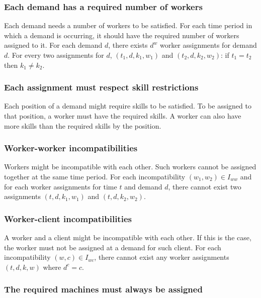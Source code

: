 \documentclass[../thesis.tex]{subfiles}
\begin{document}
\subsubsection{Each demand has a required number of workers}

Each demand needs a number of workers to be satisfied. 
For each time period in which a demand is occurring, it should have the required 
number of workers assigned to it.
For each demand $d$, there exists $d^w$ worker assignments for demand $d$. 
For every two assignments for $d$, $(t_1, d, k_1, w_1)$ and $(t_2, d, k_2, w_2)$: if $t_1 = t_2$ then $k_1 \neq k_2$.

\subsubsection{Each assignment must respect skill restrictions}

Each position of a demand might require skills to be satisfied. 
To be assigned to that position, a worker must have the required skills. 
A worker can also have more skills than the required skills by the position.

\subsubsection{Worker-worker incompatibilities}

Workers might be incompatible with each other. Such workers cannot
be assigned together at the same time period.
For each incompatibility $(w_1, w_2) \in I_{ww}$ and for each worker assignments for time $t$ and demand $d$,
there cannot exist two assignments $(t, d, k_1, w_1)$ and $(t, d, k_2, w_2)$.

\subsubsection{Worker-client incompatibilities}

A worker and a client might be incompatible with each other. 
If this is the case, the worker must not be assigned at a demand for such client.
For each incompatibility $(w, c) \in I_{wc}$, there cannot exist any worker assignments $(t, d, k, w)$ where 
$d^c = c$.

\subsubsection{The required machines must always be assigned}
\end{document}
